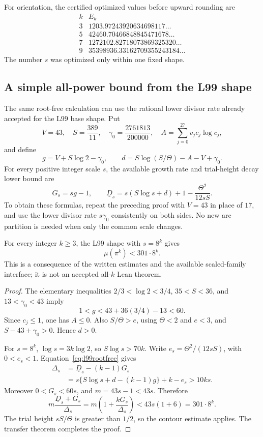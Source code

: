 For orientation, the certified optimized values before upward
rounding are
\[
\begin{array}{c|l}
k&E_k\\ \hline
3&1203.97243920634698117\ldots\\
5&42460.70466848845471678\ldots\\
7&1272102.82718073869325320\ldots\\
9&35398936.33162709355243184\ldots
\end{array}
\]
The number \(s\) was optimized only within one fixed shape.

\subsection{A simple all-power bound from the L99 shape}
\label{subsec:l99uniform}

The same root-free calculation can use the rational lower divisor
rate already accepted for the L99 base shape. Put
\[
V=43,\quad S=\frac{389}{11},\quad
\gamma_0=\frac{2761813}{200000},\quad
A=\sum_{j=0}^{27}v_jc_j\log c_j,
\]
and define
\[
g=V+S\log2-\gamma_0,\qquad
d=S\log(S/\Theta)-A-V+\gamma_0.
\]
For every positive integer scale \(s\), the available growth rate
and trial-height decay lower bound are
\begin{equation}\label{eq:l99rootfree}
G_s=sg-1,\qquad
\underline D_s=s(S\log s+d)+1-\frac{\Theta^2}{12sS}.
\end{equation}
To obtain these formulas, repeat the preceding proof with
\(V=43\) in place of \(17\), and use the lower divisor rate
\(s\gamma_0\) consistently on both sides. No new arc partition is
needed when only the common scale changes.

\begin{proposition}\label{prop:uniformL99}
For every integer \(k\ge3\), the L99 shape with \(s=8^k\) gives
\[
\mu(\pi^k)<301\cdot8^k.
\]
This is a consequence of the written estimates and the available
scaled-family interface; it is not an accepted all-\(k\) Lean theorem.
\end{proposition}
\begin{proof}
The elementary inequalities
\(2/3<\log2<3/4\), \(35<S<36\), and
\(13<\gamma_0<43\) imply
\[
1<g<43+36(3/4)-13<60.
\]
Since \(c_j\le1\), one has \(A\le0\). Also
\(S/\Theta>e\), using \(\Theta<2\) and \(e<3\), and
\(S-43+\gamma_0>0\). Hence \(d>0\).

For \(s=8^k\), \(\log s=3k\log2\), so
\(S\log s>70k\). Write \(e_s=\Theta^2/(12sS)\), with
\(0<e_s<1\). Equation~\eqref{eq:l99rootfree} gives
\begin{align*}
\Delta_s&=\underline D_s-(k-1)G_s\\
 &=s\{S\log s+d-(k-1)g\}+k-e_s
 >10ks.
\end{align*}
Moreover \(0<G_s<60s\), and \(m=43s-1<43s\). Therefore
\[
m\frac{\underline D_s+G_s}{\Delta_s}
=m\left(1+\frac{kG_s}{\Delta_s}\right)
<43s(1+6)=301\cdot8^k.
\]
The trial height \(sS/\Theta\) is greater than \(1/2\), so the
contour estimate applies. The transfer theorem completes the proof.
\end{proof}

